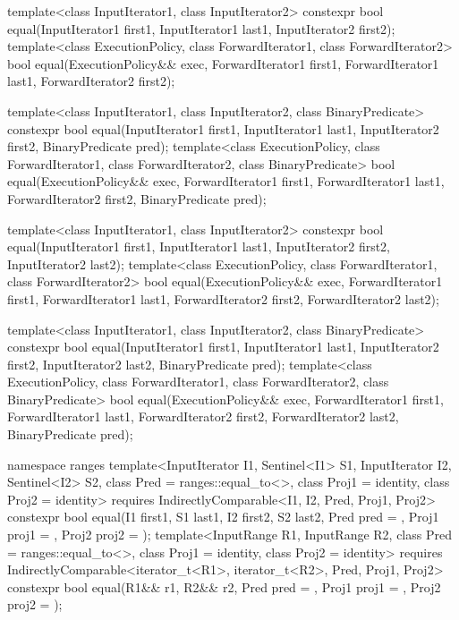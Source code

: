 %
\begin{itemdecl}
template<class InputIterator1, class InputIterator2>
  constexpr bool equal(InputIterator1 first1, InputIterator1 last1,
                       InputIterator2 first2);
template<class ExecutionPolicy, class ForwardIterator1, class ForwardIterator2>
  bool equal(ExecutionPolicy&& exec,
             ForwardIterator1 first1, ForwardIterator1 last1,
             ForwardIterator2 first2);

template<class InputIterator1, class InputIterator2,
         class BinaryPredicate>
  constexpr bool equal(InputIterator1 first1, InputIterator1 last1,
                       InputIterator2 first2, BinaryPredicate pred);
template<class ExecutionPolicy, class ForwardIterator1, class ForwardIterator2,
         class BinaryPredicate>
  bool equal(ExecutionPolicy&& exec,
             ForwardIterator1 first1, ForwardIterator1 last1,
             ForwardIterator2 first2, BinaryPredicate pred);

template<class InputIterator1, class InputIterator2>
  constexpr bool equal(InputIterator1 first1, InputIterator1 last1,
                       InputIterator2 first2, InputIterator2 last2);
template<class ExecutionPolicy, class ForwardIterator1, class ForwardIterator2>
  bool equal(ExecutionPolicy&& exec,
             ForwardIterator1 first1, ForwardIterator1 last1,
             ForwardIterator2 first2, ForwardIterator2 last2);

template<class InputIterator1, class InputIterator2,
         class BinaryPredicate>
  constexpr bool equal(InputIterator1 first1, InputIterator1 last1,
                       InputIterator2 first2, InputIterator2 last2,
                       BinaryPredicate pred);
template<class ExecutionPolicy, class ForwardIterator1, class ForwardIterator2,
         class BinaryPredicate>
  bool equal(ExecutionPolicy&& exec,
             ForwardIterator1 first1, ForwardIterator1 last1,
             ForwardIterator2 first2, ForwardIterator2 last2,
             BinaryPredicate pred);

namespace ranges {
  template<InputIterator I1, Sentinel<I1> S1, InputIterator I2, Sentinel<I2> S2,
      class Pred = ranges::equal_to<>, class Proj1 = identity, class Proj2 = identity>
    requires IndirectlyComparable<I1, I2, Pred, Proj1, Proj2>
    constexpr bool equal(I1 first1, S1 last1, I2 first2, S2 last2,
                         Pred pred = {},
                         Proj1 proj1 = {}, Proj2 proj2 = {});
  template<InputRange R1, InputRange R2, class Pred = ranges::equal_to<>,
      class Proj1 = identity, class Proj2 = identity>
    requires IndirectlyComparable<iterator_t<R1>, iterator_t<R2>, Pred, Proj1, Proj2>
    constexpr bool equal(R1&& r1, R2&& r2, Pred pred = {},
                         Proj1 proj1 = {}, Proj2 proj2 = {});
}
\end{itemdecl}

